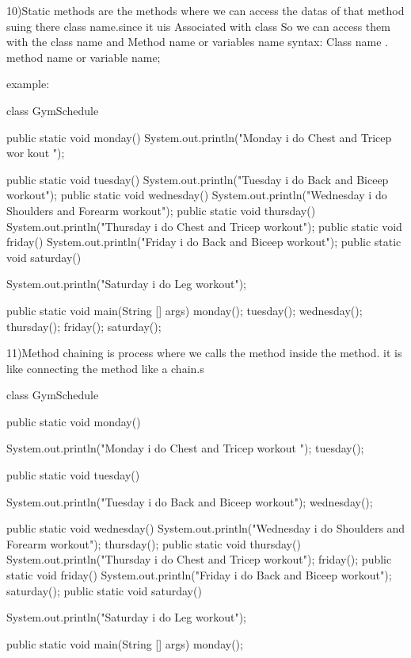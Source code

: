 10)Static methods are the methods where we can access the datas of that method suing there class name.since it uis Associated with class So we can access them with the class name and Method name or variables name
   syntax: Class name . method name or variable name;
    
   example:
   
                class GymSchedule{
						public static void monday(){
						System.out.println("Monday i do Chest and Tricep wor kout ");
							}	
							
						public static void tuesday(){
						System.out.println("Tuesday i do Back and Biceep workout");
							}
						public static void wednesday(){
						System.out.println("Wednesday i do Shoulders  and Forearm workout");
									}
						public static void thursday(){
						System.out.println("Thursday i do Chest  and Tricep workout");
								}
						public static void friday(){
						System.out.println("Friday i do Back and Biceep workout");
											}
						public static void saturday(){
						System.out.println("Saturday i do Leg workout");

												}

						public static void main(String [] args){
									monday();
									tuesday();
									wednesday();
									thursday();
									friday();
									saturday();
									}
											}
   
11)Method chaining is process where we calls the method inside the method. it  is like connecting the method like a chain.s
                      
					  class GymSchedule{
						public static void monday(){
						System.out.println("Monday i do Chest and Tricep workout ");
								tuesday();

							}	
							public static void tuesday(){
							System.out.println("Tuesday i do Back and Biceep workout");
								wednesday();

								}
								public static void wednesday(){
								System.out.println("Wednesday i do Shoulders  and Forearm workout");
								thursday();
									}
								public static void thursday(){
									System.out.println("Thursday i do Chest  and Tricep workout");
									friday();
										}
									public static void friday(){
									System.out.println("Friday i do Back and Biceep workout");
									saturday();
											}
									public static void saturday(){
									System.out.println("Saturday i do Leg workout");

									}

									public static void main(String [] args){
											monday();
										}
				                        }

